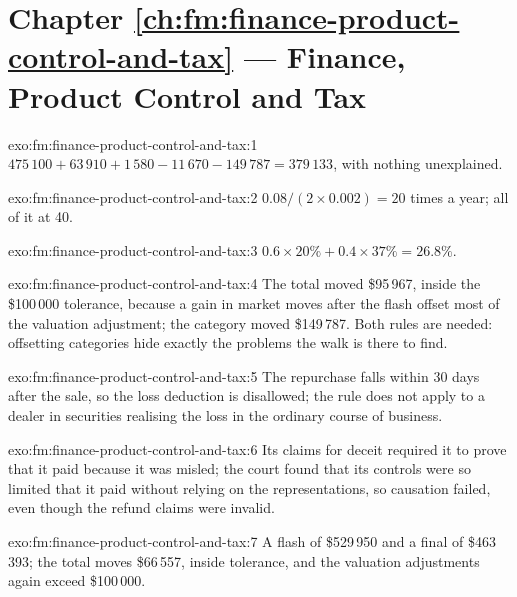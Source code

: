 \section*{Chapter \ref{ch:fm:finance-product-control-and-tax} --- Finance, Product Control and Tax}

\begin{solution}{exo:fm:finance-product-control-and-tax:1}
$475\,100+63\,910+1\,580-11\,670-149\,787=379\,133$, with nothing unexplained.
\end{solution}

\begin{solution}{exo:fm:finance-product-control-and-tax:2}
$0.08/(2\times0.002)=20$ times a year; all of it at 40.
\end{solution}

\begin{solution}{exo:fm:finance-product-control-and-tax:3}
$0.6\times20\%+0.4\times37\%=26.8\%$.
\end{solution}

\begin{solution}{exo:fm:finance-product-control-and-tax:4}
The total moved \$95\,967, inside the \$100\,000 tolerance, because a gain in market moves after the flash offset most of the valuation
adjustment; the category moved \$149\,787. Both rules are needed: offsetting categories hide exactly the problems the walk is there to find.
\end{solution}

\begin{solution}{exo:fm:finance-product-control-and-tax:5}
The repurchase falls within 30 days after the sale, so the loss deduction is disallowed; the rule does not apply to a dealer in securities
realising the loss in the ordinary course of business.
\end{solution}

\begin{solution}{exo:fm:finance-product-control-and-tax:6}
Its claims for deceit required it to prove that it paid because it was misled; the court found that its controls were so limited that it paid
without relying on the representations, so causation failed, even though the refund claims were invalid.
\end{solution}

\begin{solution}{exo:fm:finance-product-control-and-tax:7}
A flash of \$529\,950 and a final of \$463\,393; the total moves \$66\,557, inside tolerance, and the valuation adjustments again exceed
\$100\,000.
\end{solution}

